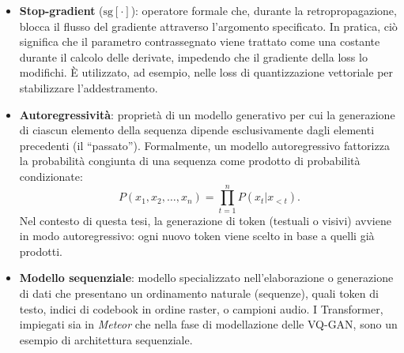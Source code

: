\begin{itemize}
	\item \textbf{Stop-gradient} ($\mathrm{sg}[\cdot]$): operatore formale che, durante la retropropagazione, blocca il flusso del gradiente attraverso l'argomento specificato. In pratica, ciò significa che il parametro contrassegnato viene trattato come una costante durante il calcolo delle derivate, impedendo che il gradiente della loss lo modifichi. È utilizzato, ad esempio, nelle loss di quantizzazione vettoriale per stabilizzare l'addestramento.
	\item \textbf{Autoregressività}: proprietà di un modello generativo per cui la generazione di ciascun elemento della sequenza dipende esclusivamente dagli elementi precedenti (il ``passato''). Formalmente, un modello autoregressivo fattorizza la probabilità congiunta di una sequenza come prodotto di probabilità condizionate: 
	$$
		P(x_1, x_2, \dots, x_n) = \prod_{t=1}^n P(x_t | x_{<t}).
	$$
	Nel contesto di questa tesi, la generazione di token (testuali o visivi) avviene in modo autoregressivo: ogni nuovo token viene scelto in base a quelli già prodotti.
	\item \textbf{Modello sequenziale}: modello specializzato nell'elaborazione o generazione di dati che presentano un ordinamento naturale (sequenze), quali token di testo, indici di codebook in ordine raster, o campioni audio. I Transformer, impiegati sia in \emph{Meteor} che nella fase di modellazione delle VQ-GAN, sono un esempio di architettura sequenziale.
\end{itemize}

